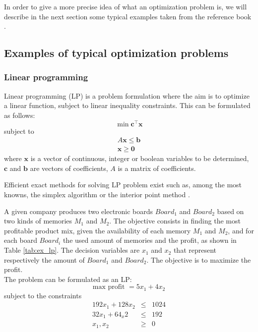 In order to give a more precise idea of what an optimization problem is, we will describe in the next section some typical examples taken from the reference book \cite{talbi09, BraMar2002}.

\subsection{Examples of typical optimization problems}
\subsubsection{Linear programming}
Linear programming (LP) is a problem formulation where the aim is to optimize a linear function, subject to linear inequality constraints. This can be formulated as follows:
\begin{equation}
\min \mathbf{c}^\intercal\mathbf{x}
\end{equation}
subject to
\begin{equation*}
\begin{gathered}
A\mathbf{x} \leq \mathbf{b}\\
\mathbf{x} \geq \mathbf{0}
\end{gathered}
\end{equation*}
where $\mathbf{x}$ is a vector of continuous, integer or boolean variables to be determined, $\mathbf{c}$ and $\mathbf{b}$ are vectors of coefficients, $A$ is a matrix of coefficients.

Efficient exact methods for solving LP problem exist such as, among the most knowns, the simplex algorithm \cite{dantzig51} or the interior point method \cite{Karmarkar84}.

\begin{example}
A given company produces two electronic boards $Board_1$ and $Board_2$ based on two kinds of memories $M_1$ and $M_2$. The objective consists in finding the most profitable product mix, given the availability of each memory $M_1$ and $M_2$, and for each board $Board_i$ the used amount of memories and the profit, as shown in Table \ref{tab:ex_lp}. The decision variables are $x_1$ and $x_2$ that represent respectively the amount of $Board_1$ and $Board_2$. The objective is to maximize the profit.\\
The problem can be formulated as an LP:
\begin{equation*}
\text{max profit } = 5x_1 + 4x_2
\end{equation*}
subject to the constraints
\begin{eqnarray*}
192x_1 + 128 x_2 &\leq& 1024\\
32x_1 + 64_x2 &\leq& 192\\
x_1, x_2 &\geq& 0
\end{eqnarray*}
\end{example}

